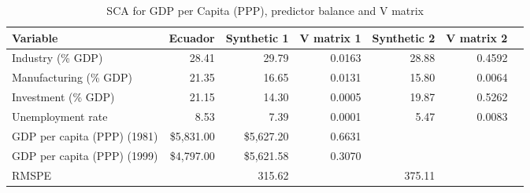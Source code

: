 \begin{table}[!htbp]
\begin{center}
\caption{SCA for GDP per Capita (PPP), predictor balance and V matrix} \label{table:GDP_balance}
\begin{tabular}{l r r r r r r}     \\ \toprule
  Variable                    &    Ecuador &  Synthetic 1 & V matrix 1 & Synthetic 2 & V matrix 2 \\ \midrule 
  Industry (\% GDP)           &      28.41 &        29.79 &     0.0163 &       28.88 &     0.4592 \\
  Manufacturing (\% GDP)      &      21.35 &        16.65 &     0.0131 &       15.80 &     0.0064 \\
  Investment (\% GDP)         &      21.15 &        14.30 &     0.0005 &       19.87 &     0.5262 \\
  Unemployment rate           &       8.53 &         7.39 &     0.0001 &        5.47 &     0.0083 \\ \midrule
  GDP per capita (PPP) (1981) & \$5,831.00 &   \$5,627.20 &     0.6631 &             &            \\
  GDP per capita (PPP) (1999) & \$4,797.00 &   \$5,621.58 &     0.3070 &             &            \\ \midrule
  RMSPE                       &            &       315.62 &            &      375.11 &            \\
  \bottomrule 
\end{tabular}
\end{center}
\end{table}


